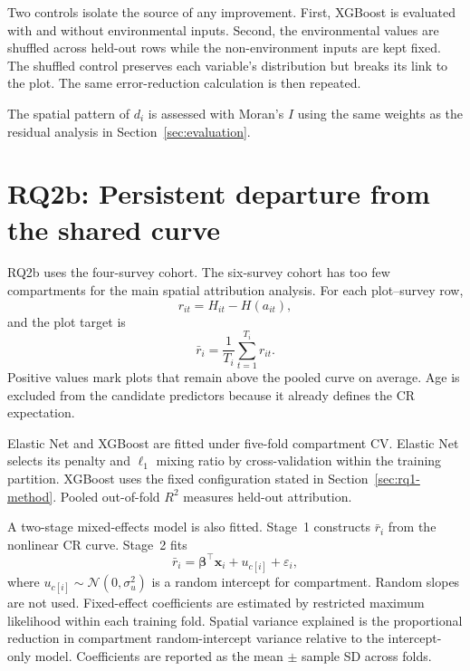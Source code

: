 Two controls isolate the source of any improvement. First, XGBoost is evaluated with and without
environmental inputs. Second, the environmental values are shuffled across held-out rows while
the non-environment inputs are kept fixed. The shuffled control preserves each variable's
distribution but breaks its link to the plot. The same error-reduction calculation is then
repeated. %

The spatial pattern of $d_i$ is assessed with Moran's $I$ using the same weights as the residual
analysis in Section~\ref{sec:evaluation}.

\section{RQ2b: Persistent departure from the shared curve}
\label{sec:rq2b-method}

RQ2b uses the four-survey cohort. The six-survey cohort has too few compartments for the main
spatial attribution analysis. For each plot--survey row,
\begin{equation}
r_{it}=H_{it}-H(a_{it}),
\end{equation}
and the plot target is
\begin{equation}
\bar r_i=\frac{1}{T_i}\sum_{t=1}^{T_i}r_{it}.
\label{eq:mean-cr-residual}
\end{equation}
Positive values mark plots that remain above the pooled curve on average. Age is excluded from the
candidate predictors because it already defines the CR expectation.

Elastic Net and XGBoost are fitted under five-fold compartment CV. Elastic Net selects its penalty
and $\ell_1$ mixing ratio by cross-validation within the training partition. XGBoost uses the fixed
configuration stated in Section~\ref{sec:rq1-method}. Pooled out-of-fold $R^2$ measures held-out
attribution.

A two-stage mixed-effects model is also fitted. Stage~1 constructs $\bar r_i$ from the nonlinear
CR curve. Stage~2 fits
\begin{equation}
\bar r_i=\boldsymbol{\beta}^{\top}\mathbf{x}_i+u_{c[i]}+\varepsilon_i,
\label{eq:mixed-effects}
\end{equation}
where $u_{c[i]}\sim\mathcal{N}(0,\sigma_u^2)$ is a random intercept for compartment. Random slopes
are not used. Fixed-effect coefficients are estimated by restricted maximum likelihood within
each training fold. Spatial variance explained is the proportional reduction in compartment
random-intercept variance relative to the intercept-only model. Coefficients are reported as the
mean $\pm$ sample SD across folds.

